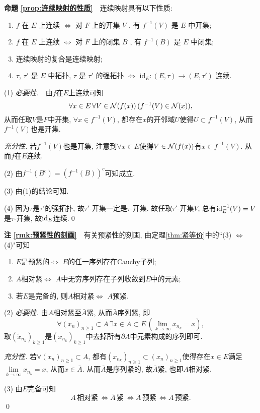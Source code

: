 	\textbf{命题\,\,\ref{prop:连续映射的性质}}\ \ 连续映射具有以下性质:
		\begin{enumerate}[(1)]
	    \item $ f $ 在 $ E $ 上连续 $ \Longleftrightarrow $ 对 $ F $ 上的开集 $ V $ , 有 $ f^{-1}(V) $ 是 $ E $ 中开集;
	    \item $ f $ 在 $ E $ 上连续 $ \Longleftrightarrow $ 对 $ F $ 上的闭集 $ B $ , 有 $ f^{-1}(B) $ 是 $ E $ 中闭集;
	    \item 连续映射的复合是连续映射;
	    \item $ \tau $, $ \tau' $ 是 $ E $ 中拓扑,  $ \tau $ 是 $ \tau' $ 的强拓扑 $ \Longleftrightarrow $ $ \mathrm{id}_{E}:(E, \tau)\to(E, \tau') $ 连续. 
		\end{enumerate}
	\begin{Proof}
	(1) \textsl{必要性.}\ \ 由$ f $在$ E $上连续可知
	\[
	\forall x\in E\,\forall V\in\mathcal{N}(f(x))\,(f^{-1}(V)\in\mathcal{N}(x)),
	\]
	从而任取$ V $是$ F $中开集, $ \forall x\in f^{-1}(V) $, 都存在$ x $的开邻域$ U $使得$ U\subset f^{-1}(V) $, 从而$ f^{-1}(V) $也是开集.
	
	\textsl{充分性.} 若$ f^{-1}(V) $也是开集, 注意到$ \forall x\in E $使得$ V\in\mathcal{N}(f(x)) $有$ x\in f^{-1}(V) $. 从而$ f $在$ E $连续.
	
	(2) 由$ f^{-1}(B^c)=(f^{-1}(B))^c $可知成立.
	
	(3) 由(1)的结论可知.
	
	(4) 因为$ \tau $是$ \tau' $的强拓扑, 故$ \tau' $-开集一定是$ \tau $-开集. 故任取$ \tau' $-开集$ V $, 总有$ \mathrm{id}_E^{-1}(V)=V $是$ \tau $-开集, 故$ \mathrm{id}_E $连续.\qed
	\end{Proof}
	
	\textbf{注\,\,\ref{rmk:预紧性的刻画}}\ \ 有关预紧性的刻画, 由定理\ref{thm:紧等价}中的``(3) $ \Leftrightarrow $ (4)"可知
	\begin{enumerate}[(1)]
	\item $ E $是预紧的$ \Longleftrightarrow $ $ E $的任一序列存在Cauchy子列;
	\item $ A $相对紧$ \Longleftrightarrow $ $ A $中无穷序列存在子列收敛到$ E $中的元素;
	\item 若$ E $是完备的, 则$ A $相对紧$ \Longleftrightarrow $ $ A $预紧.
	\end{enumerate}
	\begin{Proof}
	(2) \textsl{必要性.} 由$ A $相对紧至$ \bar{A} $紧, 从而$ \bar{A} $序列紧, 即
	\[
	\forall (x_n)_{n\geqslant 1}\subset\bar{A}\,\exists x\in\bar{A}\subset E\,(\lim_{k\to\infty}x_{n_k}=x),
	\]
	取$ (\tilde{x}_{n_k})_{k\geqslant 1} $是$ (x_{n_k})_{k\geqslant 1} $中去掉所有$ \partial A $中元素构成的序列即可.
	
	\textsl{充分性.} 若$ \forall (x_n)_{n\geqslant 1}\subset A $, 都有$ (x_{n_k})_{n\geqslant 1}\subset(x_n)_{n\geqslant 1} $使得存在$ x\in E $满足$ \lim\limits_{k\to\infty}x_{n_k}=x $, 从而$ x\in\bar{A} $. 从而$ \bar{A} $是序列紧的, 故$ \bar{A} $紧, 也即$ A $相对紧.
	
	(3) 由$ E $完备可知
	\[
	A\,\text{相对紧}\,\Longleftrightarrow\bar{A}\,\text{紧}\,\Longleftrightarrow\bar{A}\,\text{预紧}\,\Longleftrightarrow A\,\text{预紧}.
	\]
	\qed
	\end{Proof}
	
